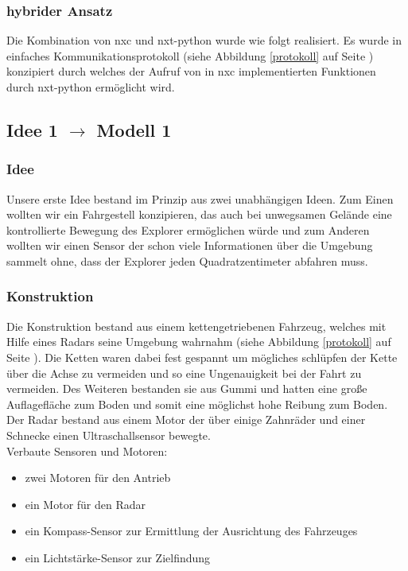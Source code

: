 \documentclass[10pt,a4paper]{scrartcl}
\begin{document}
\subsubsection{hybrider Ansatz}
Die Kombination von nxc und nxt-python wurde wie folgt realisiert. Es wurde in einfaches Kommunikationsprotokoll (siehe Abbildung \ref{protokoll} auf Seite \pageref{protokoll}) konzipiert durch welches der Aufruf von in nxc implementierten Funktionen durch nxt-python ermöglicht wird.

\subsection{Idee 1 $\rightarrow$ Modell 1}%
\subsubsection{Idee}
Unsere erste Idee bestand im Prinzip aus zwei unabhängigen Ideen. Zum Einen wollten wir ein Fahrgestell konzipieren, das auch bei unwegsamen Gelände eine kontrollierte Bewegung des Explorer ermöglichen würde und zum Anderen wollten wir einen Sensor der schon viele Informationen über die Umgebung sammelt ohne, dass der Explorer jeden Quadratzentimeter abfahren muss.
\subsubsection{Konstruktion}
Die Konstruktion bestand aus einem kettengetriebenen Fahrzeug, welches mit Hilfe eines Radars seine Umgebung wahrnahm (siehe Abbildung \ref{protokoll} auf Seite \pageref{protokoll}). Die Ketten waren dabei fest gespannt um mögliches schlüpfen der Kette über die Achse zu vermeiden und so eine Ungenauigkeit bei der Fahrt zu vermeiden. Des Weiteren bestanden sie aus Gummi und hatten eine große Auflagefläche zum Boden und somit eine möglichst hohe Reibung zum Boden. Der Radar bestand aus einem Motor der über einige Zahnräder und einer Schnecke einen Ultraschallsensor bewegte.\\
Verbaute Sensoren und Motoren:
\begin{itemize}
\item zwei Motoren für den Antrieb
\item ein Motor für den Radar
\item ein Kompass-Sensor zur Ermittlung der Ausrichtung des Fahrzeuges
\item ein Lichtstärke-Sensor zur Zielfindung
\end{itemize}
\end{document}
